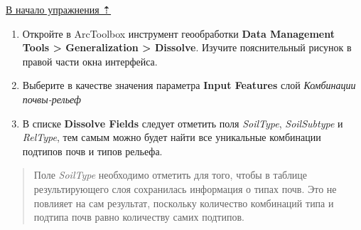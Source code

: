 \documentclass[]{book}
\theoremstyle{definition}
\theoremstyle{definition}
\theoremstyle{definition}
\theoremstyle{remark}
\begin{document}
\protect\hyperlink{overlay}{В начало упражнения ⇡}

\begin{enumerate}
\def\labelenumi{\arabic{enumi}.}
\item
  Откройте в ArcToolbox инструмент геообработки \textbf{Data Management
  Tools \textgreater{} Generalization \textgreater{} Dissolve}. Изучите
  пояснительный рисунок в правой части окна интерфейса.
\item
  Выберите в качестве значения параметра \textbf{Input Features} слой
  \emph{Комбинации почвы-рельеф}
\item
  В списке \textbf{Dissolve Fields} следует отметить поля
  \emph{SoilType}, \emph{SoilSubtype} и \emph{RelType}, тем самым можно
  будет найти все уникальные комбинации подтипов почв и типов рельефа.
\end{enumerate}

\begin{quote}
Поле \emph{SoilType} необходимо отметить для того, чтобы в таблице
результирующего слоя сохранилась информация о типах почв. Это не
повлияет на сам результат, поскольку количество комбинаций типа и
подтипа почв равно количеству самих подтипов.
\end{quote}
\end{document}
